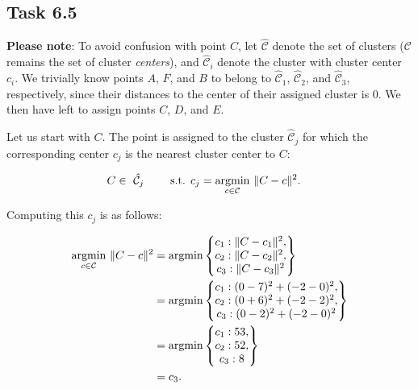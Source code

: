 \newcommand{\C}{\hat{\mathcal{C}}}
\subsection{Task 6.5}

\textbf{Please note}: To avoid confusion with point $C$, let $\C$ denote the set of clusters
($\mathcal C$ remains the set of cluster \textit{centers}), and $\C_i$ denote
the cluster with cluster center $c_i$. We trivially know points $A$, $F$, and
$B$ to belong to $\C_1$, $\C_2$, and $\C_3$, respectively, since their distances
to the center of their assigned cluster is 0. We then have left to assign points
$C$, $D$, and $E$.

Let us start with $C$. The point is assigned to the cluster $\C_j$ for which the
corresponding center $c_j$ is the nearest cluster center to $C$:

\begin{align*}
  C \in\ \C_j \qquad \text{ s.t. }  c_j &= \argmin_{c \in \mathcal C}\ \sed{C - c}.
\end{align*}

\newpage
Computing this $c_j$ is as follows:

\begin{align}
   \operatorname*{argmin}_{c \in \mathcal C}\ \lVert C - c \rVert^2\nonumber
       &= \operatorname*{argmin} \left\{
       \begin{matrix}
         c_1 : \lVert C - c_1 \rVert^2,\\
         c_2 : \lVert C - c_2 \rVert^2,\\
         c_3 : \lVert C - c_3 \rVert^2
       \end{matrix}
       \right\}\nonumber\\
     &= \operatorname*{argmin} \left\{
     \begin{matrix}
       c_1 : (0 - 7)^2 + (-2 - 0)^2,\\
       c_2 : (0 + 6)^2 + (-2 - 2)^2,\\
       c_3 : (0 - 2)^2 + (-2 - 0)^2
     \end{matrix}
     \right\}\nonumber\\
     &= \operatorname*{argmin} \left\{
     \begin{matrix}
       c_1 : 53,\\
       c_2 : 52,\\
       c_3 : 8
     \end{matrix}
     \right\}\nonumber\\
   &= c_3.\label{eq:cluster_assignment}
\end{align}

